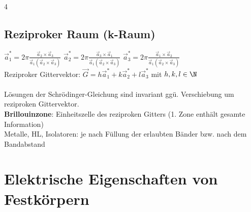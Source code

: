 \documentclass[fs, footer]{latex4ei_custom}
\begin{document}
\begin{multicols*}{4}
	\subsection{Reziproker Raum (k-Raum)}
	$\vec a_1^* = 2\pi \frac{\vec a_2 \times \vec a_3}{\vec a_1(\vec a_2 \times \vec a_3)}$ \quad $\vec a_2^* = 2\pi \frac{\vec a_3 \times \vec a_1}{\vec a_1(\vec a_2 \times \vec a_3)}$ \quad $\vec a_3^* = 2\pi \frac{\vec a_1 \times \vec a_2}{\vec a_1(\vec a_2 \times \vec a_3)}$ \\
	Reziproker Gittervektor: $\vec G = h\vec a_1^* + k\vec a_2^* + l\vec a_3^*$ mit $h, k, l \in \N$\\ \\
	Lösungen der Schrödinger-Gleichung sind invariant ggü. Verschiebung um reziproken Gittervektor.\\
	\textbf{Brillouinzone}: Einheitszelle des reziproken Gitters (1. Zone enthält gesamte Information)\\
	Metalle, HL, Isolatoren: je nach Füllung der erlaubten Bänder bzw. nach dem Bandabstand

	\columnbreak

	\section{Elektrische Eigenschaften von Festkörpern}
	\\ \\
	\sectionbox{

}
\end{multicols*}
\end{document}
